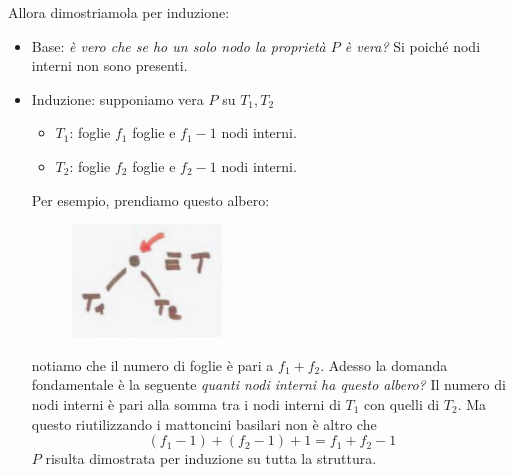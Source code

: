 \documentclass{article}
\begin{document}
Allora dimostriamola per induzione:
\begin{itemize}
    \item Base: \textit{è vero che se ho un solo nodo la proprietà $P$ è vera?} Si poiché
          nodi interni non sono presenti.
    \item Induzione: supponiamo vera $P$ su $T_1,T_2$
          \begin{itemize}
              \item $T_1$: foglie $f_1$ foglie e $f_1-1$ nodi interni.
              \item $T_2$: foglie $f_2$ foglie e $f_2-1$ nodi interni.
          \end{itemize}

          Per esempio, prendiamo questo albero:
          \begin{figure}[H]
              \centering
              \includegraphics[scale=0.6]{images/BT_2.png}
          \end{figure}
          notiamo che il numero di foglie è pari a $f_1+f_2$. Adesso la domanda fondamentale è la seguente
          \textit{quanti nodi interni ha questo albero?} Il numero di nodi interni è pari alla somma tra i nodi
          interni di $T_1$ con quelli di $T_2$. Ma questo riutilizzando i mattoncini basilari non è altro che
          $$(f_1-1) + (f_2-1) + 1 = f_1 + f_2 -1$$
          $P$ risulta dimostrata per induzione su tutta la struttura.
\end{itemize}
\end{document}
